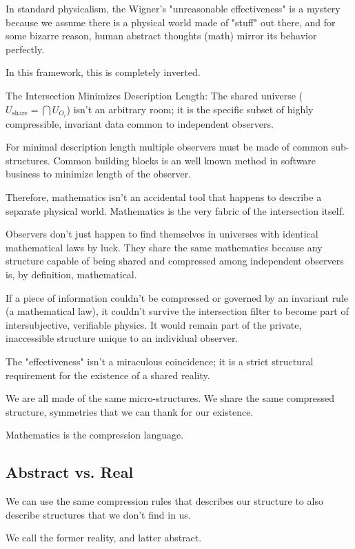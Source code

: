 In standard physicalism, the Wigner's "unreasonable effectiveness" is a mystery because we assume there is a
physical world made of "stuff" out there, and for some bizarre reason,
human abstract thoughts (math) mirror its behavior perfectly.

In this framework, this is completely inverted.

The Intersection Minimizes Description Length: The shared universe ($U_{\text{share}} = \bigcap U_{O_i}$) isn't an arbitrary room;
it is the specific subset of highly compressible, invariant data common to independent observers.

For minimal description length multiple observers must be made of common sub-structures. Common building blocks is an
well known method in software business to minimize length of the observer.

Therefore, mathematics isn't an accidental tool that happens to describe a separate physical world.
Mathematics is the very fabric of the intersection itself.

Observers don't just happen to find themselves in universes with identical mathematical laws by luck.
They share the same mathematics because any structure capable of being shared and compressed among independent observers is,
by definition, mathematical.

If a piece of information couldn't be compressed or governed by an invariant rule (a mathematical law),
it couldn't survive the intersection filter to become part of intersubjective, verifiable physics.
It would remain part of the private, inaccessible structure unique to an individual observer.

The "effectiveness" isn't a miraculous coincidence; it is a strict structural requirement for the existence of a shared reality.

We are all made of the same micro-structures. We share the same compressed structure, symmetries that we can thank for our existence.

Mathematics is the compression language.


\subsection*{Abstract vs. Real}

We can use the same compression rules that describes our structure to also describe structures that we don't find in us.

We call the former reality, and latter abstract.



